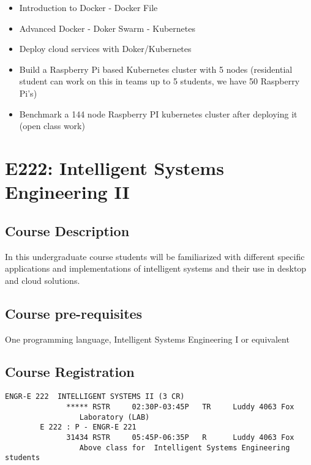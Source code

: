 \begin{itemize}
\item Introduction to Docker - Docker File
\item Advanced Docker - Doker Swarm -  Kubernetes
\item Deploy cloud services with Doker/Kubernetes
\item Build a Raspberry Pi based Kubernetes cluster with 5 nodes
  (residential student can work on this in teams up to 5 students, we
  have 50 Raspberry Pi's)
\item Benchmark a 144 node Raspberry PI kubernetes cluster after
  deploying it (open class work)
\end{itemize}

\chapter{E222: Intelligent Systems Engineering II}

\section{Course Description}

In this undergraduate course students will be familiarized with
different specific applications and implementations of intelligent
systems and their use in desktop and cloud solutions.

\section{Course pre-requisites}

One programming language, Intelligent Systems Engineering I or equivalent

\section{Course Registration}


\begin{verbatim}
ENGR-E 222  INTELLIGENT SYSTEMS II (3 CR)
              ***** RSTR     02:30P-03:45P   TR     Luddy 4063 Fox
                 Laboratory (LAB)
        E 222 : P - ENGR-E 221
              31434 RSTR     05:45P-06:35P   R      Luddy 4063 Fox
                 Above class for  Intelligent Systems Engineering students

\end{verbatim}        


